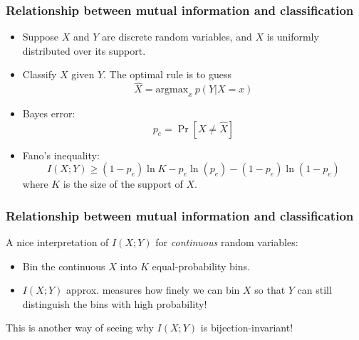 \documentclass{beamer}
\newcommand{\argmax}{\text{argmax}}
\begin{document}
\begin{frame}
\frametitle{Relationship between mutual information and classification}
\begin{itemize}
\item Suppose $X$ and $Y$ are discrete random variables, and $X$ is uniformly distributed over its support.
\item Classify $X$ given $Y$.  The optimal rule is to guess
\[
\hat{X} = \argmax_x\ p(Y|X=x)
\]
\item Bayes error:
\[
p_e = \Pr[X \neq \hat{X}]
\]
\item Fano's inequality:
\[
I(X; Y) \geq (1-p_e) \ln K - p_e \ln(p_e) - (1-p_e)\ln(1-p_e)
\]
where $K$ is the size of the support of $X$.
\end{itemize}
\end{frame}

\begin{frame}
\frametitle{Relationship between mutual information and classification}
A nice interpretation of $I(X; Y)$ for \emph{continuous} random variables:
\begin{itemize}
\item Bin the continuous $X$ into $K$ equal-probability bins.
\item $I(X;Y)$ approx. measures how finely we can bin $X$ so that $Y$ can still distinguish the bins with high probability!
\end{itemize}

This is another way of seeing why $I(X;Y)$ is bijection-invariant!
\end{frame}
\end{document}
